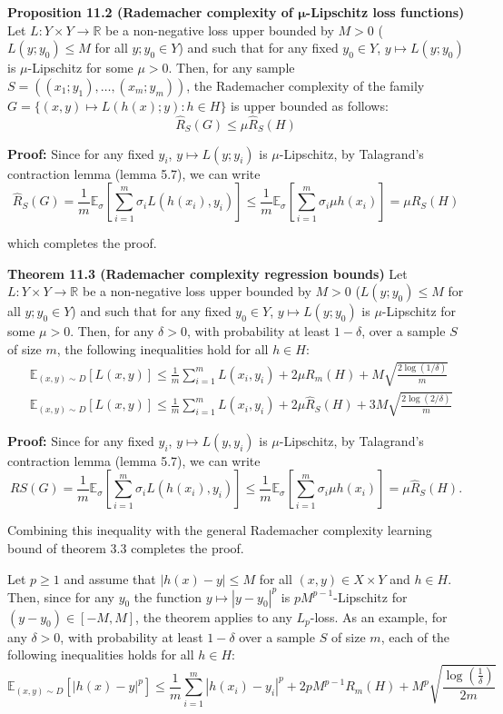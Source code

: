 \documentclass[fleqn,10pt]{olplainarticle}
\begin{document}
\textbf{Proposition 11.2 (Rademacher complexity of $\boldsymbol{\mu}$-Lipschitz loss functions)} Let $L: Y \times Y \to \mathbb{R}$ be a non-negative loss upper bounded by $M > 0$ ($L(y; y_0) \leq M$ for all $y; y_0 \in Y$) and such that for any fixed $y_0 \in Y$, $y \mapsto L(y; y_0)$ is $\mu$-Lipschitz for some $\mu > 0$. Then, for any sample $S = ((x_1; y_1), \ldots, (x_m; y_m))$, the Rademacher complexity of the family $G = \{ (x, y) \mapsto L(h(x); y) : h \in H \}$ is upper bounded as follows:
\[ \hat{R}_S(G) \leq \mu \hat{R}_S(H) \]

\textbf{Proof:} Since for any fixed $y_i$, $y \mapsto L(y; y_i)$ is $\mu$-Lipschitz, by Talagrand's contraction lemma (lemma 5.7), we can write
\[
\hat{R}_S(G) = \frac{1}{m} \mathbb{E}_\sigma \left[ \sum_{i=1}^m \sigma_i L(h(x_i), y_i) \right] \leq \frac{1}{m} \mathbb{E}_\sigma \left[ \sum_{i=1}^m \sigma_i \mu h(x_i) \right] = \mu \hat{R}_S(H)
\]

which completes the proof.

\textbf{Theorem 11.3 (Rademacher complexity regression bounds)} Let $L: Y \times Y \to \mathbb{R}$ be a non-negative loss upper bounded by $M > 0$ ($L(y; y_0) \leq M$ for all $y; y_0 \in Y$) and such that for any fixed $y_0 \in Y$, $y \mapsto L(y; y_0)$ is $\mu$-Lipschitz for some $\mu > 0$. Then, for any $\delta > 0$, with probability at least $1 - \delta$, over a sample $S$ of size $m$, the following inequalities hold for all $h \in H$:
\[
\begin{aligned}
&\mathbb{E}_{(x,y) \sim D} \left[ L(x, y) \right] \leq \frac{1}{m} \sum_{i=1}^m L(x_i, y_i) + 2\mu R_m(H) + M\sqrt{\frac{2\log(1/\delta)}{m}} \\
&\mathbb{E}_{(x,y) \sim D} \left[ L(x, y) \right] \leq \frac{1}{m} \sum_{i=1}^m L(x_i, y_i) + 2\mu \hat{R}_S(H) + 3M\sqrt{\frac{2\log(2/\delta)}{m}}
\end{aligned}
\]

\textbf{Proof:} Since for any fixed $y_i$, $y \mapsto L(y, y_i)$ is $\mu$-Lipschitz, by Talagrand's contraction lemma (lemma 5.7), we can write
\[
RS(G) = \frac{1}{m} \mathbb{E}_\sigma \left[ \sum_{i=1}^m \sigma_i L(h(x_i), y_i) \right] \leq \frac{1}{m} \mathbb{E}_\sigma \left[ \sum_{i=1}^m \sigma_i \mu h(x_i) \right] = \mu \hat{R}_S(H).
\]

Combining this inequality with the general Rademacher complexity learning bound of theorem 3.3 completes the proof. 

Let \( p \geq 1 \) and assume that \( |h(x) - y| \leq M \) for all \( (x, y) \in X \times Y \) and \( h \in H \). Then, since for any \( y_0 \) the function \( y \mapsto |y - y_0|^p \) is \( pM^{p-1} \)-Lipschitz for \( (y - y_0) \in [-M, M] \), the theorem applies to any \( L_p \)-loss. As an example, for any \( \delta > 0 \), with probability at least \( 1 - \delta \) over a sample \( S \) of size \( m \), each of the following inequalities holds for all \( h \in H \):
\[
\mathbb{E}_{(x,y) \sim D} \left[ \left| h(x) - y \right|^p \right] \leq \frac{1}{m} \sum_{i=1}^m \left|  h(x_i) - y_i  \right|^p + 2pM^{p-1}R_m(H) + M^p \sqrt{\frac{\log\left(\frac{1}{\delta}\right)}{2m}}
\]
\end{document}
